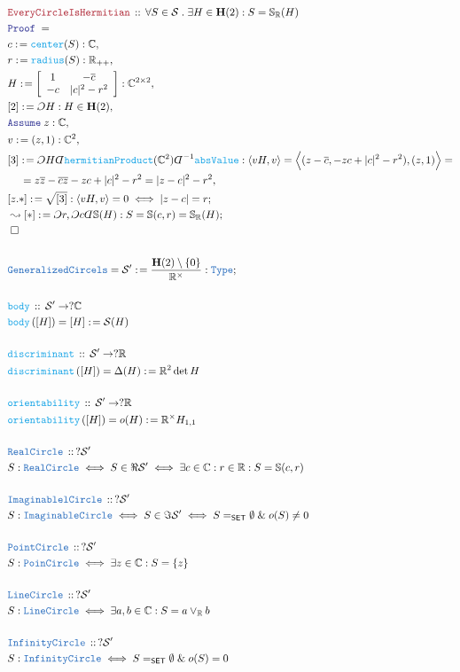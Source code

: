 \documentclass[12pt]{scrartcl}
\newcommand{\TYPE}[1]{\textcolor{NavyBlue}{\mathtt{#1}}}
\newcommand{\FUNC}[1]{\textcolor{Cerulean}{\mathtt{#1}}}
\newcommand{\LOGIC}[1]{\textcolor{Blue}{\mathtt{#1}}}
\newcommand{\THM}[1]{\textcolor{Maroon}{\mathtt{#1}}}
\renewcommand{\.}{\; . \;}
\newcommand{\de}{: \kern 0.1pc =}
\newcommand{\Act}[1]{\left( #1 \right)}
\newcommand{\Theorem}[2]{& \THM{#1} \, :: \, #2 \\ & \Proof = \\ }
\newcommand{\DeclareType}[2]{& \TYPE{#1} \, :: \, #2 \\}
\newcommand{\DefineType}[3]{& #1 : \TYPE{#2} \iff #3 \\}
\newcommand{\DefineNamedType}[4]{& #1 : \TYPE{#2} \iff #3 \iff #4 \\}
\newcommand{\DeclareFunc}[2]{& \FUNC{#1} \, :: \, #2 \\}
\newcommand{\DefineNamedFunc}[4]{&  \FUNC{#1}\Act{#2} = #3 \de #4 \\}
\newcommand{\NewLine}{\\ & \kern 1pc}
\newcommand{\Page}[1]{ \begin{align*} #1 \end{align*}   }
\newcommand{ \bd }{ \ByDef }
\renewcommand{\And}{\; \& \;}
\newcommand{\Type}{\TYPE{Type}}
\newcommand{\Reals}{\mathbb{R} }
\newcommand{\Complex}{\mathbb{C}}
\newcommand{\Sphere}{\mathbb{S}}
\newcommand{\Say}[3]{& #1 \de #2 : #3, \\}
\newcommand{\Conclude}[3]{& #1 \de #2 : #3; \\}
\newcommand{\DeriveConclude}[3]{& \leadsto #1 \de #2 : #3 ; \\}
\newcommand{\Assume}[2]{& \LOGIC{Assume} \; #1 : #2, \\}
\newcommand{\QED}{\; \square}
\newcommand{\EndProof}{& \QED \\}
\newcommand{\ByDef}{\rotatebox[origin=c]{-180}{$D$}}%
\newcommand{\ByConstr}{\rotatebox[origin=c]{-180}{$C$}}%
\newcommand{\Proof}{\LOGIC{Proof} \; }
\newcommand{\SET}{\mathsf{SET}}
\renewcommand{\S}{\mathcal{S}}
\newcommand{\Herm}{\mathbf{H}}
\begin{document}
\Page{
	\Theorem{EveryCircleIsHermitian}{\forall S \in \S \. \exists H \in \Herm(2) : S = \Sphere_\Reals(H)}
	\Say{c}{\FUNC{center}(S)}{\Complex}
	\Say{r}{\FUNC{radius}(S)}{\Reals_{++}}
	\Say{H}{\left[\begin{array}{cc} 1 & -\overline{c} \\ -c  & |c|^2 - r^2 \end{array} \right] }{\Complex^{2 \times 2}}
	\Say{[2]}{\ByConstr H}{H \in \Herm(2)}
	\Assume{z}{\Complex}
	\Say{v}{(z,1)}{\Complex^2}
	\Say{[3]}{\ByConstr H \bd \FUNC{hermitianProduct}(\Complex^2) \bd^{-1} \FUNC{absValue}}
	{
		\langle vH, v \rangle = 
		\Big\langle (z - \overline{c},  -zc + |c|^2 - r^2  ),(z,1)  \Big\rangle = \NewLine = 
		z\overline{z} - \overline{c}\overline{z} - zc  + |c|^2 - r^2 = 
		| z - c|^2 - r^2
	}
	\Conclude{[z.*]}{\sqrt{[3]}}{\langle vH, v \rangle = 0 \iff | z - c| = r}
	\DeriveConclude{[*]}{\ByConstr r, \ByConstr c \bd \Sphere(H)}{ S = \Sphere(c,r) = \Sphere_\Reals(H)}
	\EndProof
	\\
	\Conclude{\TYPE{GeneralizedCircels} = \S'}{\frac{\Herm(2) \setminus \{0\}}{\Reals^\times}}{\Type}
	\\
	\DeclareFunc{body}{\S' \to ?\Complex}
	\DefineNamedFunc{body}{[H]}{[H]}{\S(H)}
	\\
	\DeclareFunc{discriminant}{\S' \to ?\Reals}
	\DefineNamedFunc{discriminant}{[H]}{\Delta(H)}{\Reals^2 \det H}
	\\
	\DeclareFunc{orientability}{\S' \to ?\Reals}
	\DefineNamedFunc{orientability}{[H]}{o(H)}{\Reals^\times H_{1,1}}
	\\
	\DeclareType{RealCircle}{?\S'}
	\DefineNamedType{S}{RealCircle}{S \in \Re \S'}{\exists c \in \Complex : r \in \Reals : S =  \Sphere(c,r) }
	\\
	\DeclareType{ImaginablelCircle}{?\S'}
	\DefineNamedType{S}{ImaginableCircle}{S \in \Im \S'}{ S =_{\SET}  \emptyset \And o(S) \neq 0 }
	\\
	\DeclareType{PointCircle}{?\S'}
	\DefineType{S}{PoinCircle}{\exists z \in \Complex : S = \{ z \}}
	\\
	\DeclareType{LineCircle}{?\S'}
	\DefineType{S}{LineCircle}{\exists a,b \in \Complex : S = a \vee_{\Reals} b}
	\\
	\DeclareType{InfinityCircle}{?\S'}
	\DefineType{S}{InfinityCircle}{S =_{\SET} \emptyset \And o(S)  = 0}
}
\end{document}
